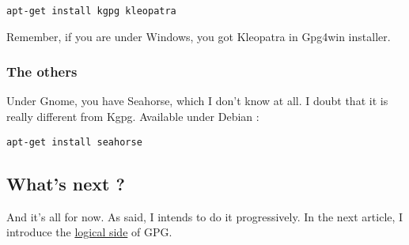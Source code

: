 \begin{verbatim}
apt-get install kgpg kleopatra
\end{verbatim}

Remember, if you are under Windows, you got Kleopatra in Gpg4win
installer.

\subsubsection{The others}\label{the-others-1}

Under Gnome, you have Seahorse, which I don't know at all. I doubt that
it is really different from Kgpg. Available under Debian :

\begin{verbatim}
apt-get install seahorse
\end{verbatim}

\subsection{What's next ?}\label{whats-next}

And it's all for now. As said, I intends to do it progressively. In the
next article, I introduce the \href{\{filename\}3-logic-en.md}{logical
side} of GPG.
